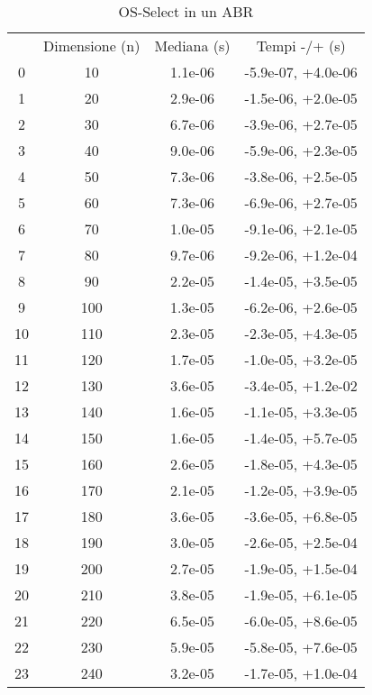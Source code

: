 \begin{table}
\centering
\caption{OS-Select in un ABR}
\label{OS-Select in un ABR}
\begin{adjustbox}{width=1\textwidth/2}
\begin{tabular}{|c|c|c|c|}
\hline
 & Dimensione (n) & Mediana (s) & Tempi -/+ (s) \\
0 & 10 & 1.1e-06 & -5.9e-07, +4.0e-06 \\
\cline{1-4}
1 & 20 & 2.9e-06 & -1.5e-06, +2.0e-05 \\
\cline{1-4}
2 & 30 & 6.7e-06 & -3.9e-06, +2.7e-05 \\
\cline{1-4}
3 & 40 & 9.0e-06 & -5.9e-06, +2.3e-05 \\
\cline{1-4}
4 & 50 & 7.3e-06 & -3.8e-06, +2.5e-05 \\
\cline{1-4}
5 & 60 & 7.3e-06 & -6.9e-06, +2.7e-05 \\
\cline{1-4}
6 & 70 & 1.0e-05 & -9.1e-06, +2.1e-05 \\
\cline{1-4}
7 & 80 & 9.7e-06 & -9.2e-06, +1.2e-04 \\
\cline{1-4}
8 & 90 & 2.2e-05 & -1.4e-05, +3.5e-05 \\
\cline{1-4}
9 & 100 & 1.3e-05 & -6.2e-06, +2.6e-05 \\
\cline{1-4}
10 & 110 & 2.3e-05 & -2.3e-05, +4.3e-05 \\
\cline{1-4}
11 & 120 & 1.7e-05 & -1.0e-05, +3.2e-05 \\
\cline{1-4}
12 & 130 & 3.6e-05 & -3.4e-05, +1.2e-02 \\
\cline{1-4}
13 & 140 & 1.6e-05 & -1.1e-05, +3.3e-05 \\
\cline{1-4}
14 & 150 & 1.6e-05 & -1.4e-05, +5.7e-05 \\
\cline{1-4}
15 & 160 & 2.6e-05 & -1.8e-05, +4.3e-05 \\
\cline{1-4}
16 & 170 & 2.1e-05 & -1.2e-05, +3.9e-05 \\
\cline{1-4}
17 & 180 & 3.6e-05 & -3.6e-05, +6.8e-05 \\
\cline{1-4}
18 & 190 & 3.0e-05 & -2.6e-05, +2.5e-04 \\
\cline{1-4}
19 & 200 & 2.7e-05 & -1.9e-05, +1.5e-04 \\
\cline{1-4}
20 & 210 & 3.8e-05 & -1.9e-05, +6.1e-05 \\
\cline{1-4}
21 & 220 & 6.5e-05 & -6.0e-05, +8.6e-05 \\
\cline{1-4}
22 & 230 & 5.9e-05 & -5.8e-05, +7.6e-05 \\
\cline{1-4}
23 & 240 & 3.2e-05 & -1.7e-05, +1.0e-04 \\

\end{tabular}
\end{adjustbox}
\end{table}
